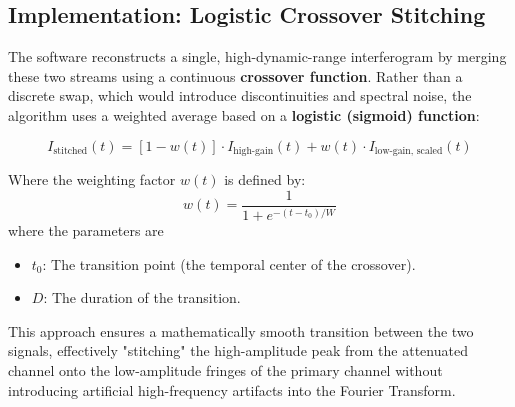 \documentclass[8pt,a4paper]{article}
\begin{document}
	\subsection{Implementation: Logistic Crossover Stitching}
	The software reconstructs a single, high-dynamic-range interferogram by merging these two streams using a continuous \textbf{crossover function}. Rather than a discrete swap, which would introduce discontinuities and spectral noise, the algorithm uses a weighted average based on a \textbf{logistic (sigmoid) function}:
	
	\begin{equation}
		I_{\text{stitched}}(t) = [1 - w(t)] \cdot I_{\text{high-gain}}(t) + w(t) \cdot I_{\text{low-gain, scaled}}(t)
	\end{equation}
	
	Where the weighting factor $w(t)$ is defined by:
	\begin{equation}
		w(t) = \frac{1}{1 + e^{-(t - t_0)/W}}
	\end{equation}
	where the parameters are
	\begin{itemize}
		\item $t_0$: The transition point (the temporal center of the crossover).
		\item $D$: The duration of the transition.
	\end{itemize}
	
	This approach ensures a mathematically smooth transition between the two signals, effectively "stitching" the high-amplitude peak from the attenuated channel onto the low-amplitude fringes of the primary channel without introducing artificial high-frequency artifacts into the Fourier Transform.
	
	
\end{document}
